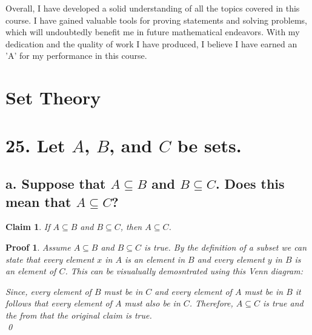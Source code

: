 \documentclass{article}
\newtheorem*{claim}{Claim}
\newtheorem*{poof}{Proof}
\begin{document}
Overall, I have developed a solid understanding of all the topics covered in this course. I have gained valuable tools for proving statements and solving problems, which will undoubtedly benefit me in future mathematical endeavors. With my dedication and the quality of work I have produced, I believe I have earned an 'A' for my performance in this course.


\newpage
\section*{Set Theory}
\section*{25. Let $A$, $B$, and $C$ be sets.}
\subsection*{a. Suppose that $A \subseteq B$ and $B \subseteq C$. Does this mean that $A \subseteq C$?}
\begin{claim}
    If $A \subseteq B$ and $B \subseteq C$, then $A \subseteq C$.
\end{claim}
\begin{poof}
    Assume $A \subseteq B$ and $B \subseteq C$ is true. By the definition of a subset we can state that every element $x$ in $A$ is an element in $B$ and every element $y$ in $B$ is an element of $C$. This can be visualually demosntrated using this Venn diagram:
    \begin{center}
    \end{center}
    Since, every element of $B$ must be in $C$ and every element of $A$ must be in $B$ it follows that every element of $A$ must also be in $C$. Therefore, $A \subseteq C$ is true and the  from that the original claim is true. \\
    \qed
\end{poof}
\end{document}
